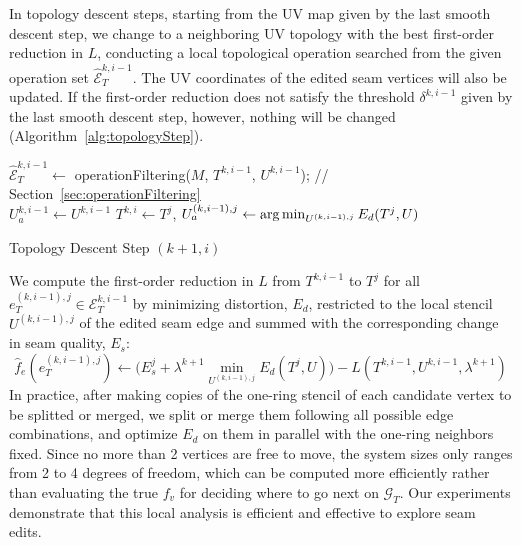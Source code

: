 In topology descent steps, starting from the UV map given by the last smooth descent step, we change to a neighboring UV topology with the best first-order reduction in $L$, conducting a local topological operation searched from the given operation set $\hat{\mathcal{E}}^{k,i-1}_T$. The UV coordinates of the edited seam vertices will also be updated. If the first-order reduction does not satisfy the threshold $\delta^{k,i-1}$ given by the last smooth descent step, however, nothing will be changed (Algorithm~\ref{alg:topologyStep}).

\begin{algorithm}[h]
\SetAlgoLined
{}
$\hat{\mathcal{E}}^{k,i-1}_T \leftarrow$ operationFiltering($M$, $T^{k,i-1}$, $U^{k,i-1}$); // Section~\ref{sec:operationFiltering}\\
$U_a^{k,i-1} \leftarrow U^{k,i-1}$\;
{
  $T^{k,i} \leftarrow T^j$, $U_a^{(k,i-1),j} \leftarrow \operatorname*{arg\,min}_{U^{(k,i-1),j}} E_d(T^j,U)$\;
}
\caption{Topology Descent Step $(k+1,i)$}
\label{alg:topologyStep}
\end{algorithm}
 
We compute the first-order reduction in $L$ from $T^{k,i-1}$ to $T^j$ for all $e^{(k,i-1),j}_T \in \mathcal{E}^{k,i-1}_T$ by minimizing distortion, $E_d$, restricted to the local stencil $U^{(k,i-1),j}$ of the edited seam edge and summed with the corresponding change in seam quality, $E_s$:
\[\hat{f}_e(e^{(k,i-1),j}_{T}) \leftarrow \Big(E^j_s + \lambda^{k+1} \min_{U^{(k,i-1),j}} E_d(T^j,U)\Big) - L(T^{k,i-1},U^{k,i-1},\lambda^{k+1})\]
In practice, after making copies of the one-ring stencil of each candidate vertex to be splitted or merged, we split or merge them following all possible edge combinations, and optimize $E_d$ on them in parallel with the one-ring neighbors fixed. Since no more than 2 vertices are free to move, the system sizes only ranges from 2 to 4 degrees of freedom, which can be computed more efficiently rather than evaluating the true $f_v$ for deciding where to go next on $\mathcal{G}_T$. Our experiments demonstrate that this local analysis is efficient and effective to explore seam edits.


